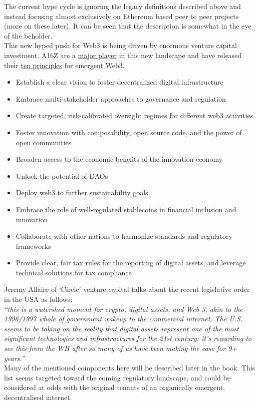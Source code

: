 The current hype cycle is ignoring the legacy definitions described above and instead focusing almost exclusively on Ethereum based peer to peer projects (more on these later). It can be seen that the description is somewhat in the eye of the beholder.\\
This new hyped push for Web3 is being driven by enormous venture capital investment. A16Z are a \href{https://a16z.com/2022/01/07/9b-to-build-the-future/}{major player} in this new landscape and have released their \href{https://a16z.com/2022/01/07/how-to-build-a-better-internet-10-principles-for-world-leaders-shaping-the-future-of-web3/}{ten principles} for emergent Web3. 
\begin{itemize}
\item Establish a clear vision to foster decentralized digital infrastructure
\item Embrace multi-stakeholder approaches to governance and regulation
\item Create targeted, risk-calibrated oversight regimes for different web3 activities
\item Foster innovation with composability, open source code, and the power of open communities
\item Broaden access to the economic benefits of the innovation economy
\item Unlock the potential of DAOs
\item Deploy web3 to further sustainability goals
\item Embrace the role of well-regulated stablecoins in financial inclusion and innovation
\item Collaborate with other nations to harmonize standards and regulatory frameworks
\item Provide clear, fair tax rules for the reporting of digital assets, and leverage technical solutions for tax compliance
\end{itemize}
Jeremy Allaire of `Circle' venture capital talks about the recent legislative order in the USA as follows:\\
\textit{``this is a watershed moment for crypto, digital assets, and Web 3, akin to the 1996/1997 whole of government wakeup to the commercial internet. The U.S. seems to be taking on the reality that digital assets represent one of the most significant technologies and infrastructures for the 21st century; it's rewarding to see this from the WH after so many of us have been making the case for 9+ years.''}\\
Many of the mentioned components here will be described later in the book. This list seems targeted toward the coming regulatory landscape, and could be considered at odds with the original tenants of an organically emergent, decentralised internet.\\
